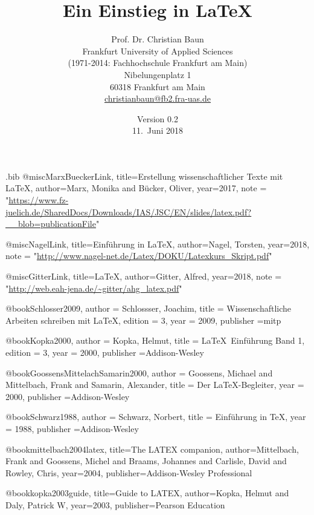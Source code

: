 \documentclass[a4paper,10pt,twoside]{scrbook}
\begin{document}
\begin{filecontents*}{\jobname.bib}
@misc{MarxBueckerLink,
	title={{Erstellung wissenschaftlicher Texte mit \LaTeX}},
	author={Marx, Monika and Bücker, Oliver},
	year={2017},
	note = "\url{https://www.fz-juelich.de/SharedDocs/Downloads/IAS/JSC/EN/slides/latex.pdf?__blob=publicationFile}"
}
   
@misc{NagelLink,
   	title={{Einführung in \LaTeX}},
   	author={Nagel, Torsten},
   	year={2018},
   	note = "\url{http://www.nagel-net.de/Latex/DOKU/Latexkurs_Skript.pdf}"
}

@misc{GitterLink,
	title={{\LaTeX}},
	author={Gitter, Alfred},
	year={2018},
	note = "\url{http://web.eah-jena.de/~gitter/ahg_latex.pdf}"
}

@book{Schlosser2009,
	author = {Schlossser, Joachim},
	title = {{Wissenschaftliche Arbeiten schreiben mit \LaTeX}},
	edition = {3},
	year = {2009},
	publisher ={mitp}
}


@book{Kopka2000,
	author = {Kopka, Helmut},
	title = {{\LaTeX\ Einführung Band 1}},
	edition = {3},
	year = {2000},
	publisher ={Addison-Wesley}
}


@book{GoossensMittelachSamarin2000,
	author = {Goossens, Michael and Mittelbach, Frank and Samarin, Alexander},
	title = {{Der \LaTeX-Begleiter}},
	year = {2000},
	publisher ={Addison-Wesley}
}


@book{Schwarz1988,
	author = {Schwarz, Norbert},
	title = {{Einführung in \TeX}},
	year = {1988},
    publisher ={Addison-Wesley}
}
  
@book{mittelbach2004latex,
	title={The LATEX companion},
	author={Mittelbach, Frank and Goossens, Michel and Braams, Johannes and Carlisle, David and Rowley, Chris},
	year={2004},
	publisher={Addison-Wesley Professional}
}

@book{kopka2003guide,
	title={Guide to LATEX},
	author={Kopka, Helmut and Daly, Patrick W},
	year={2003},
	publisher={Pearson Education}
}

\end{filecontents*}

\renewcommand{\arraystretch}{1}

\title{Ein Einstieg in \LaTeX}
\author{Prof. Dr. Christian Baun\\ Frankfurt University of Applied Sciences \\ (1971-2014: Fachhochschule Frankfurt am Main)\\
Nibelungenplatz 1 \\ 60318 Frankfurt am Main\\\url{christianbaun@fb2.fra-uas.de}\\[3em]}
\date{Version 0.2\\[3em] 11.~Juni 2018}
\end{document}
